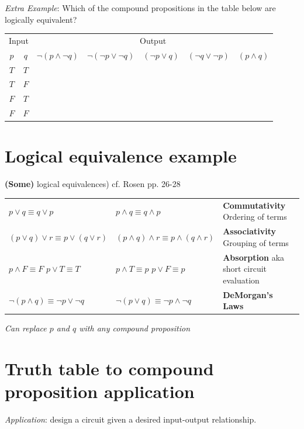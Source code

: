 \documentclass[12pt, oneside]{article}
\begin{document}
{\it Extra Example}: Which of the  compound propositions in the table below are logically equivalent?
\begin{center}
\begin{tabular}{cc||c|c|c|c|c}
\multicolumn{2}{c||}{Input}  & \multicolumn{5}{c}{Output} \\
$p$ & $q$ & $\lnot (p \land \lnot q)$ & $\lnot (\lnot p  \lor \lnot q)$ &  $(\lnot p \lor  q)$
& $(\lnot q \lor \lnot p)$ & $(p \land q)$  \\
\hline
$T$ & $T$ & &&&&\\
$T$ & $F$ & &&&&\\
$F$ & $T$ & &&&&\\
$F$ & $F$ & &&&&\\
\end{tabular}
\end{center} \vfill
\section*{Logical equivalence example}


{\bf (Some)} logical equivalences) cf. Rosen pp. 26-28

\begin{tabular}{llp{3in}}
$p \lor q \equiv q \lor p$ & $p \land q \equiv q \land p$ & {\bf Commutativity} Ordering of terms\\
$(p \lor q) \lor r  \equiv p \lor (q \lor r)$ & $(p \land q) \land r  \equiv p \land (q \land r)$ & {\bf Associativity} Grouping of terms\\
$p \land F \equiv F$ \qquad $p \lor T \equiv T$ & $p \land T \equiv p$ \qquad $p \lor F \equiv p$ & {\bf Absorption} aka 
short circuit evaluation\\
$\lnot (p \land q) \equiv \lnot p \lor \lnot q$ & $\lnot (p \lor q) \equiv \lnot p \land\lnot q$  & {\bf DeMorgan's Laws}\end{tabular}


{\it Can replace $p$ and $q$ with any compound proposition}

\vfill \vfill
\section*{Truth table to compound proposition application}


{\it Application}: design a circuit given a desired input-output relationship.
\end{document}

